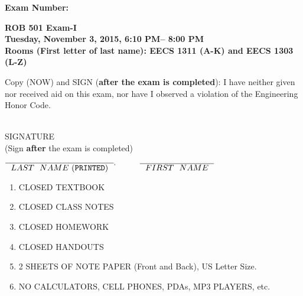 \documentclass[letterpaper]{article}
\newcommand{\bline}[1]{\underline{\hspace*{#1}}}
\begin{document}


\begin{flushright}
{\bf Exam Number:}\bline{0.6in}
\end{flushright}

\vspace*{.1in}
\begin{center}
\LARGE \bf
ROB 501 Exam-I \\
\large
Tuesday, November 3, 2015, 6:10 PM-- 8:00 PM \\
Rooms (First letter of last name): EECS 1311 (A-K) and EECS 1303 (L-Z) \\
\end{center}

\vspace*{1in}

 Copy (NOW) and SIGN ({\bf after the exam is completed}): I have neither given nor received aid on this exam, nor have I observed a violation of the
Engineering Honor Code.

\vspace*{1in}
\begin{flushright}
\underline{\hspace*{2.5in}} \\
SIGNATURE \\
(Sign {\bf after} the exam is completed)
\end{flushright}

\vspace*{1in}

\begin{center}
$\overline{\mathrm ~~LAST~~NAME~ ({\tt PRINTED})~~}^, \hspace*{.4in} \overline{\mathrm ~~FIRST~~NAME~~}$ \\

\end{center}

\vspace*{.45in} 
\begin{enumerate}
\item CLOSED TEXTBOOK
\item CLOSED CLASS NOTES
\item CLOSED HOMEWORK
\item CLOSED HANDOUTS
\item 2  SHEETS OF NOTE PAPER (Front and Back), US Letter Size.
\item NO CALCULATORS, CELL PHONES, PDAs, MP3 PLAYERS, etc.
\end{enumerate}
\vspace*{.4in}
\end{document}
